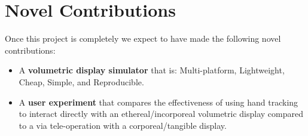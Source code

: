 \section{Novel Contributions}
Once this project is completely we expect to have made the following novel contributions:
\begin{itemize}
    \item A \textbf{volumetric display simulator} that is: Multi-platform, Lightweight, Cheap, Simple, and Reproducible.
    \item A \textbf{user experiment} that compares the effectiveness of using hand tracking to interact directly with an ethereal/incorporeal volumetric display compared to a via tele-operation with a corporeal/tangible display.
\end{itemize}